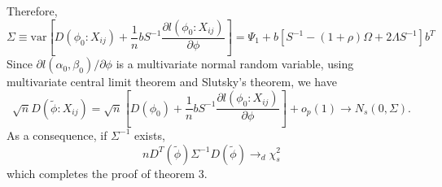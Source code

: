 \documentclass[12]{interact}
\theoremstyle{plain}%
\theoremstyle{definition}
\theoremstyle{remark}
\begin{document}
Therefore,
\begin{equation}
	\Sigma \equiv \mbox{var}\left[ D(\phi_0:X_{ij})+ \frac{1}{n}bS^{-1}\frac{\partial l(\phi_0: X_{ij})}{\partial \phi}\right] =\Psi_1 + b[S^{-1}-(1+\rho)\Omega + 2 \Lambda S^{-1}]b^T
\end{equation}
Since $\partial l(\alpha_0,\beta_0)/\partial \phi$ is a multivariate normal random variable, using multivariate central limit theorem and Slutsky's theorem, we have
\begin{equation}
	\sqrt{n}D(\tilde{\phi}: X_{ij})=\sqrt{n}\left[D(\phi_0)
	+\frac{1}{n}bS^{-1}\frac{\partial l(\phi_0: X_{ij})}{\partial \phi
	}\right]+o_p(1)\rightarrow N_s(0,\Sigma).
\end{equation}
As a consequence, if $\Sigma^{-1}$ exists,
$$nD^T(\tilde{\phi})\Sigma^{-1}D(\tilde{\phi})\rightarrow_d \chi^2_s$$
\noindent which completes the proof of theorem 3.




\end{document}
